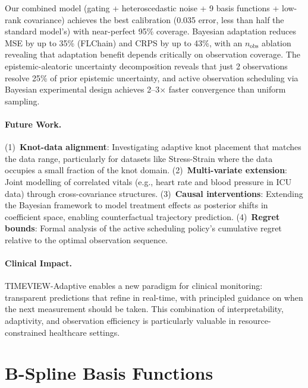 \documentclass[final]{article}
\begin{document}
Our combined model (gating + heteroscedastic noise + 9 basis functions + low-rank covariance) achieves the best calibration (0.035 error, less than half the standard model's) with near-perfect 95\% coverage. Bayesian adaptation reduces MSE by up to 35\% (FLChain) and CRPS by up to 43\%, with an $n_{\mathrm{obs}}$ ablation revealing that adaptation benefit depends critically on observation coverage. The epistemic-aleatoric uncertainty decomposition reveals that just 2 observations resolve 25\% of prior epistemic uncertainty, and active observation scheduling via Bayesian experimental design achieves 2--3$\times$ faster convergence than uniform sampling.

\paragraph{Future Work.}
(1)~\textbf{Knot-data alignment}: Investigating adaptive knot placement that matches the data range, particularly for datasets like Stress-Strain where the data occupies a small fraction of the knot domain.
(2)~\textbf{Multi-variate extension}: Joint modelling of correlated vitals (e.g., heart rate and blood pressure in ICU data) through cross-covariance structures.
(3)~\textbf{Causal interventions}: Extending the Bayesian framework to model treatment effects as posterior shifts in coefficient space, enabling counterfactual trajectory prediction.
(4)~\textbf{Regret bounds}: Formal analysis of the active scheduling policy's cumulative regret relative to the optimal observation sequence.

\paragraph{Clinical Impact.} TIMEVIEW-Adaptive enables a new paradigm for clinical monitoring: transparent predictions that refine in real-time, with principled guidance on when the next measurement should be taken. This combination of interpretability, adaptivity, and observation efficiency is particularly valuable in resource-constrained healthcare settings.






\newpage
\appendix
\section{B-Spline Basis Functions}
\label{sec:bspline_fig}
\end{document}
